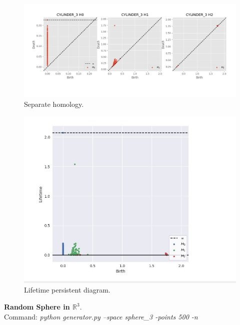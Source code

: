 \documentclass[11pt,a4paper]{report}
\begin{document}
              \begin{figure}[H]
                \centering
                \includegraphics[width=\linewidth]{./ripser/on_cylinder_pers_homology_sep.jpg}
                \caption{Separate homology.}
                \label{fig:sep hom}
              \end{figure}

              \begin{figure}[H]
                \centering
                \includegraphics[width=0.5\linewidth, scale=0.5]{./ripser/on_cylinder_lifetime.jpg}
                \caption{Lifetime persistent diagram.}
                \label{fig:sep hom}
              \end{figure}

              \textbf{Random Sphere in $\mathbb{R}^3$}.\\
              Command: \textit{python generator.py --space sphere\_3 -points 500 -n}
\end{document}
